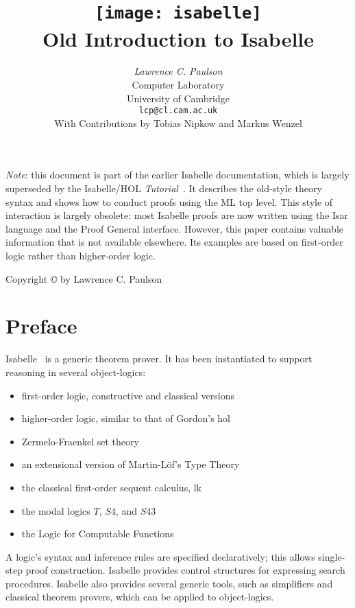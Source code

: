 \documentclass[12pt,a4paper]{article}
\title{\texttt{[image: isabelle]} \\[4ex] Old Introduction to Isabelle}
\author{{\em Lawrence C. Paulson}\\
        Computer Laboratory \\ University of Cambridge \\
        \texttt{lcp@cl.cam.ac.uk}\\[3ex] 
        With Contributions by Tobias Nipkow and Markus Wenzel
}
\begin{document}
\pagestyle{empty}
\begin{titlepage}
\maketitle 
\emph{Note}: this document is part of the earlier Isabelle documentation, 
which is largely superseded by the Isabelle/HOL
\emph{Tutorial}~\cite{isa-tutorial}. It describes the old-style theory 
syntax and shows how to conduct proofs using the 
ML top level. This style of interaction is largely obsolete:
most Isabelle proofs are now written using the Isar 
language and the Proof General interface. However, this paper contains valuable 
information that is not available elsewhere. Its examples are based 
on first-order logic rather than higher-order logic.

\thispagestyle{empty}
\vfill
{\small Copyright \copyright{} \number\year{} by Lawrence C. Paulson}
\end{titlepage}

\pagestyle{headings}
\part*{Preface}
 
Isabelle~\cite{paulson-natural,paulson-found,paulson700} is a generic theorem
prover.  It has been instantiated to support reasoning in several
object-logics:
\begin{itemize}
\item first-order logic, constructive and classical versions
\item higher-order logic, similar to that of Gordon's {\sc
hol}~\cite{mgordon-hol}
\item Zermelo-Fraenkel set theory~\cite{suppes72}
\item an extensional version of Martin-L\"of's Type Theory~\cite{nordstrom90}
\item the classical first-order sequent calculus, {\sc lk}
\item the modal logics $T$, $S4$, and $S43$
\item the Logic for Computable Functions~\cite{paulson87}
\end{itemize}
A logic's syntax and inference rules are specified declaratively; this
allows single-step proof construction.  Isabelle provides control
structures for expressing search procedures.  Isabelle also provides
several generic tools, such as simplifiers and classical theorem provers,
which can be applied to object-logics.
\end{document}

